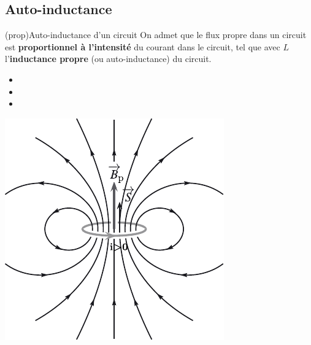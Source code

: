 \documentclass[../../main/main.tex]{subfiles}
\begin{document}
\subsection{Auto-inductance}
\label{ssec:autoind}
\begin{tcb*}[sidebyside, righthand ratio=.35](prop){Auto-inductance d'un circuit}
	On admet que le flux propre dans un circuit est \textbf{proportionnel à
		l'intensité} du courant dans le circuit, tel que
	\psw{%
		\[
			\boxed{\F_p(t) = Li(t)}
		\]
	}%
	avec $L$ l'\textbf{inductance propre} (ou auto-inductance) du circuit.
	\begin{itemize}
		\item {}%
		\item {}%
		\item {}%
	\end{itemize}
	\tcblower
	\begin{center}
		\includegraphics[width=\linewidth]{fpropre}
		\label{fig:fpropre}
	\end{center}
\end{tcb*}
\end{document}
